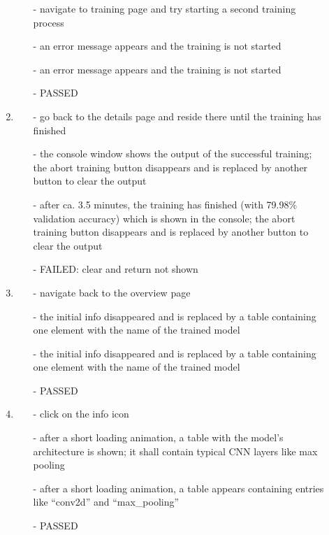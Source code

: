 \begin{description}
\begin{enumerate}
		\begin{itemize}
			\item [-] navigate to training page and try starting a second training process
			\item [-] an error message appears and the training is not started
			\item [-] an error message appears and the training is not started
			\item [-] PASSED
		\end{itemize}
		\item
		\begin{itemize}
			\item [-] go back to the details page and reside there until the training has finished
			\item [-] the console window shows the output of the successful training; the abort training button disappears and is replaced by another button to clear the output
			\item [-] after ca. 3.5 minutes, the training has finished (with 79.98\% validation accuracy) which is shown in the console; the abort training button disappears and is replaced by another button to clear the output
			\item [-] FAILED: clear and return not shown %
		\end{itemize}
		\item
		\begin{itemize}
			\item [-] navigate back to the overview page
			\item [-] the initial info disappeared and is replaced by a table containing one element with the name of the trained model
			\item [-] the initial info disappeared and is replaced by a table containing one element with the name of the trained model
			\item [-] PASSED
		\end{itemize}
		\item
		\begin{itemize}
			\item [-] click on the info icon
			\item [-] after a short loading animation, a table with the model's architecture is shown; it shall contain typical CNN layers like max pooling
			\item [-] after a short loading animation, a table appears containing entries like \enquote{conv2d} and \enquote{max\_pooling}
			\item [-] PASSED

\end{itemize}
\end{enumerate}
\end{description}
